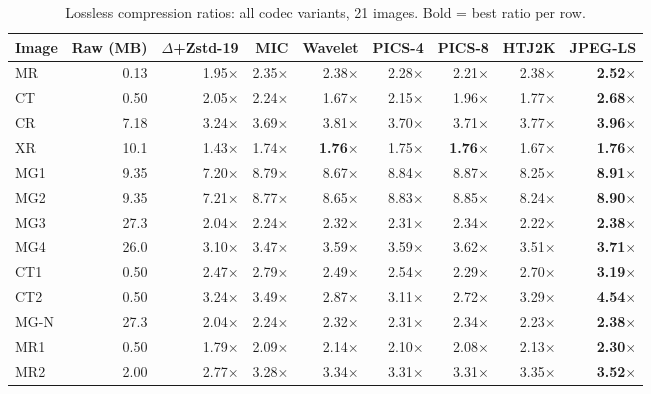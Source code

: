 \documentclass[journal]{IEEEtran}
\begin{document}
\begin{table}[t]
\centering
\caption{Lossless compression ratios: all codec variants, 21 images. Bold =
best ratio per row.}
\label{tab:ratios}
\scriptsize
\begin{tabular}{lrrrrrrrr}
\toprule
Image & Raw (MB) & $\Delta$+Zstd-19 & MIC & Wavelet & PICS-4 & PICS-8 & HTJ2K & JPEG-LS \\
\midrule
MR   & 0.13 & 1.95$\times$ & 2.35$\times$ & 2.38$\times$ & 2.28$\times$ & 2.21$\times$ & 2.38$\times$ & \textbf{2.52$\times$} \\
CT   & 0.50 & 2.05$\times$ & 2.24$\times$ & 1.67$\times$ & 2.15$\times$ & 1.96$\times$ & 1.77$\times$ & \textbf{2.68$\times$} \\
CR   & 7.18 & 3.24$\times$ & 3.69$\times$ & 3.81$\times$ & 3.70$\times$ & 3.71$\times$ & 3.77$\times$ & \textbf{3.96$\times$} \\
XR   & 10.1 & 1.43$\times$ & 1.74$\times$ & \textbf{1.76$\times$} & 1.75$\times$ & \textbf{1.76$\times$} & 1.67$\times$ & \textbf{1.76$\times$} \\
MG1  & 9.35 & 7.20$\times$ & 8.79$\times$ & 8.67$\times$ & 8.84$\times$ & 8.87$\times$ & 8.25$\times$ & \textbf{8.91$\times$} \\
MG2  & 9.35 & 7.21$\times$ & 8.77$\times$ & 8.65$\times$ & 8.83$\times$ & 8.85$\times$ & 8.24$\times$ & \textbf{8.90$\times$} \\
MG3  & 27.3 & 2.04$\times$ & 2.24$\times$ & 2.32$\times$ & 2.31$\times$ & 2.34$\times$ & 2.22$\times$ & \textbf{2.38$\times$} \\
MG4  & 26.0 & 3.10$\times$ & 3.47$\times$ & 3.59$\times$ & 3.59$\times$ & 3.62$\times$ & 3.51$\times$ & \textbf{3.71$\times$} \\
CT1  & 0.50 & 2.47$\times$ & 2.79$\times$ & 2.49$\times$ & 2.54$\times$ & 2.29$\times$ & 2.70$\times$ & \textbf{3.19$\times$} \\
CT2  & 0.50 & 3.24$\times$ & 3.49$\times$ & 2.87$\times$ & 3.11$\times$ & 2.72$\times$ & 3.29$\times$ & \textbf{4.54$\times$} \\
MG-N & 27.3 & 2.04$\times$ & 2.24$\times$ & 2.32$\times$ & 2.31$\times$ & 2.34$\times$ & 2.23$\times$ & \textbf{2.38$\times$} \\
MR1  & 0.50 & 1.79$\times$ & 2.09$\times$ & 2.14$\times$ & 2.10$\times$ & 2.08$\times$ & 2.13$\times$ & \textbf{2.30$\times$} \\
MR2  & 2.00 & 2.77$\times$ & 3.28$\times$ & 3.34$\times$ & 3.31$\times$ & 3.31$\times$ & 3.35$\times$ & \textbf{3.52$\times$} \\

\end{tabular}
\end{table}
\end{document}

